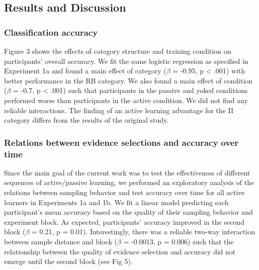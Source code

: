 \documentclass[10pt, letterpaper]{article}
\begin{document}
\subsection{Results and Discussion}\label{results-and-discussion-1}

\subsubsection{Classification accuracy}\label{classification-accuracy-1}

Figure 3 shows the effects of category structure and training condition
on participants' overall accuracy. We fit the same logistic regression
as specified in Experiment 1a and found a main effect of category
(\(\beta\) = -0.95, p \textless{} .001) with better performance in the
RB category. We also found a main effect of condition (\(\beta\) = -0.7,
p \textless{} .001) such that participants in the passive and yoked
conditions performed worse than participants in the active condition. We
did not find any reliable interactions. The finding of an active
learning advantage for the II category differs from the results of the
original study.

\subsubsection{Relations between evidence selections and accuracy over
time}\label{relations-between-evidence-selections-and-accuracy-over-time}

Since the main goal of the current work was to test the effectiveness of
different sequences of active/passive learning, we performed an
exploratory analysis of the relations between sampling behavior and test
accuracy over time for all active learners in Experiments 1a and 1b. We
fit a linear model predicting each participant's mean accuracy based on
the quality of their sampling behavior and experiment block. As
expected, participants' accuracy improved in the second block (\(\beta\)
= 0.21, p = 0.01). Interestingly, there was a reliable two-way
interaction between sample distance and block (\(\beta\) = -0.0013, p =
0.006) such that the relationship between the quality of evidence
selection and accuracy did not emerge until the second block (see Fig
5).
\end{document}
